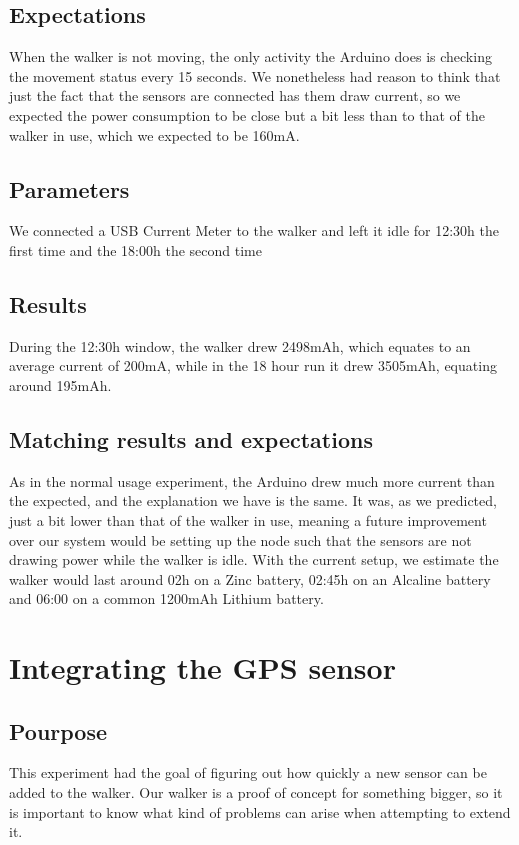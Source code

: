 	\subsection*{Expectations}
		When the walker is not moving, the only activity the Arduino does is checking the movement status every 15 seconds. We nonetheless had reason to think that just the fact that the sensors are connected has them draw current, so we expected the power consumption to be close but a bit less than to that of the walker in use, which we expected to be 160mA.
	\subsection*{Parameters}
		We connected a USB Current Meter to the walker and left it idle for 12:30h the first time and the 18:00h the second time
	\subsection*{Results}
		During the 12:30h window, the walker drew 2498mAh, which equates to an average current of 200mA, while in the 18 hour run it drew 3505mAh, equating around 195mAh.
	\subsection*{Matching results and expectations}
		As in the normal usage experiment, the Arduino drew much more current than the expected, and the explanation we have is the same. It was, as we predicted, just a bit lower than that of the walker in use, meaning a future improvement over our system would be setting up the node such that the sensors are not drawing power while the walker is idle.
		With the current setup, we estimate the walker would last around 02h on a Zinc battery, 02:45h on an Alcaline battery and 06:00 on a common 1200mAh Lithium battery.

\section{Integrating the GPS sensor}
	\subsection*{Pourpose}
	This experiment had the goal of figuring out how quickly a new sensor can be added to the walker. Our walker is a proof of concept for something bigger, so it is important to know what kind of problems can arise when attempting to extend it.

